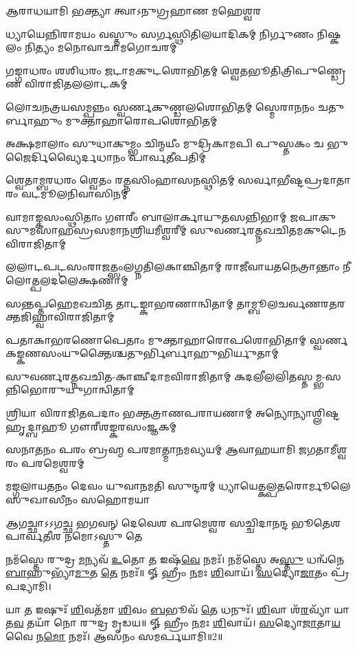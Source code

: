 
{𑌆𑌰𑌾𑌧𑌯𑌾𑌮𑌿 𑌭𑌕𑍍𑌤𑍍𑌯𑌾 𑌤𑍍𑌵𑌾𑌽𑌨𑍁𑌗𑍍𑌰𑌹𑌾𑌣 𑌮𑌹𑍇𑌶𑍍𑌵𑌰}



\twolineshloka
{𑌧𑍍𑌯𑌾𑌯𑍇𑌨𑍍𑌨𑌿𑌰𑌾𑌮𑌯𑌂 𑌵𑌸𑍍𑌤𑍁𑌂 𑌸𑌰𑍍𑌗𑌸𑍍𑌥𑌿𑌤𑌿𑌲𑌯𑌾𑌦𑌿𑌕𑌮𑍍}
{𑌨𑌿𑌰𑍍𑌗𑍁𑌣𑌂 𑌨𑌿𑌷𑍍𑌕𑌲𑌂 𑌨𑌿𑌤𑍍𑌯𑌂 𑌮𑌨𑍋𑌵𑌾𑌚𑌾𑌮𑌗𑍋𑌚𑌰𑌮𑍍}

\twolineshloka
{𑌗𑌙𑍍𑌗𑌾𑌧𑌰𑌂 𑌶𑌶𑌿𑌧𑌰𑌂 𑌜𑌟𑌾𑌮𑌕𑍁𑌟𑌶𑍋𑌭𑌿𑌤𑌮𑍍}
{𑌶𑍍𑌵𑍇𑌤𑌭𑍂𑌤𑌿𑌤𑍍𑌰𑌿𑌪𑍁𑌣𑍍𑌡𑍍𑌰𑍇𑌣 𑌵𑌿𑌰𑌾𑌜𑌿𑌤𑌲𑌲𑌾𑌟𑌕𑌮𑍍}

\twolineshloka
{𑌲𑍋𑌚𑌨𑌤𑍍𑌰𑌯𑌸𑌮𑍍𑌪𑌨𑍍𑌨𑌂 𑌸𑍍𑌵𑌰𑍍𑌣𑌕𑍁𑌣𑍍𑌡𑌲𑌶𑍋𑌭𑌿𑌤𑌮𑍍}
{𑌸𑍍𑌮𑍇𑌰𑌾𑌨𑌨𑌂 𑌚𑌤𑍁𑌰𑍍𑌬𑌾𑌹𑍁𑌂 𑌮𑍁𑌕𑍍𑌤𑌾𑌹𑌾𑌰𑍋𑌪𑌶𑍋𑌭𑌿𑌤𑌮𑍍}

\twolineshloka
{𑌅𑌕𑍍𑌷𑌮𑌾𑌲𑌾𑌂 𑌸𑍁𑌧𑌾𑌕𑍁𑌮𑍍𑌭𑌂 𑌚𑌿𑌨𑍍𑌮𑌯𑍀𑌂 𑌮𑍁𑌦𑍍𑌰𑌿𑌕𑌾𑌮𑌪𑌿}
{𑌪𑍁𑌸𑍍𑌤𑌕𑌂 𑌚 𑌭𑍁𑌜𑍈𑌰𑍍𑌦𑌿𑌵𑍍𑌯𑍈𑌰𑍍𑌦𑌧𑌾𑌨𑌂 𑌪𑌾𑌰𑍍𑌵𑌤𑍀𑌪𑌤𑌿𑌮𑍍}

\twolineshloka
{𑌶𑍍𑌵𑍇𑌤𑌾𑌮𑍍𑌬𑌰𑌧𑌰𑌂 𑌶𑍍𑌵𑍇𑌤𑌂 𑌰𑌤𑍍𑌨𑌸𑌿𑌂𑌹𑌾𑌸𑌨𑌸𑍍𑌥𑌿𑌤𑌮𑍍}
{𑌸𑌰𑍍𑌵𑌾𑌭𑍀𑌷𑍍𑌟𑌪𑍍𑌰𑌦𑌾𑌤𑌾𑌰𑌂 𑌵𑌟𑌮𑍂𑌲𑌨𑌿𑌵𑌾𑌸𑌿𑌨𑌮𑍍}

\threelineshloka
{𑌵𑌾𑌮𑌾𑌙𑍍𑌕𑌸𑌂𑌸𑍍𑌥𑌿𑌤𑌾𑌂 𑌗𑍗𑌰𑍀𑌂 𑌬𑌾𑌲𑌾𑌰𑍍𑌕𑌾𑌯𑍁𑌤𑌸𑌨𑍍𑌨𑌿𑌭𑌾𑌮𑍍}
{𑌜𑌪𑌾𑌕𑍁𑌸𑍁𑌮𑌸𑌾𑌹𑌸𑍍𑌰𑌸𑌮𑌾𑌨𑌶𑍍𑌰𑌿𑌯𑌮𑍀𑌶𑍍𑌵𑌰𑍀𑌮𑍍}
{𑌸𑍁𑌵𑌰𑍍𑌣𑌰𑌤𑍍𑌨𑌖𑌚𑌿𑌤𑌮𑌕𑍁𑌟𑍇𑌨 𑌵𑌿𑌰𑌾𑌜𑌿𑌤𑌾𑌮𑍍}

\twolineshloka
{𑌲𑌲𑌾𑌟𑌪𑌟𑍍𑌟𑌸𑌂𑌰𑌾𑌜𑌤𑍍𑌸𑌂𑌲𑌗𑍍𑌨𑌤𑌿𑌲𑌕𑌾𑌞𑍍𑌚𑌿𑌤𑌾𑌮𑍍}
{𑌰𑌾𑌜𑍀𑌵𑌾𑌯𑌤𑌨𑍇𑌤𑍍𑌰𑌾𑌨𑍍𑌤𑌾𑌂 𑌨𑍀𑌲𑍋𑌤𑍍𑌪𑌲𑌦𑌲𑍇𑌕𑍍𑌷𑌣𑌾𑌮𑍍}

\twolineshloka
{𑌸𑌨𑍍𑌤𑌪𑍍𑌤𑌹𑍇𑌮𑌖𑌚𑌿𑌤 𑌤𑌾𑌟𑌙𑍍𑌕𑌾𑌭𑌰𑌣𑌾𑌨𑍍𑌵𑌿𑌤𑌾𑌮𑍍}
{𑌤𑌾𑌮𑍍𑌬𑍂𑌲𑌚𑌰𑍍𑌵𑌣𑌰𑌤𑌰𑌕𑍍𑌤𑌜𑌿𑌹𑍍𑌵𑌾𑌵𑌿𑌰𑌾𑌜𑌿𑌤𑌾𑌮𑍍}

\twolineshloka
{𑌪𑌤𑌾𑌕𑌾𑌭𑌰𑌣𑍋𑌪𑍇𑌤𑌾𑌂 𑌮𑍁𑌕𑍍𑌤𑌾𑌹𑌾𑌰𑍋𑌪𑌶𑍋𑌭𑌿𑌤𑌾𑌮𑍍}
{𑌸𑍍𑌵𑌰𑍍𑌣𑌕𑌙𑍍𑌕𑌣𑌸𑌂𑌯𑍁𑌕𑍍𑌤𑍈𑌶𑍍𑌚𑌤𑍁𑌰𑍍𑌭𑌿𑌰𑍍𑌬𑌾𑌹𑍁𑌭𑌿𑌰𑍍𑌯𑍁𑌤𑌾𑌮𑍍}

\twolineshloka
{𑌸𑍁𑌵𑌰𑍍𑌣𑌰𑌤𑍍𑌨𑌖𑌚𑌿𑌤-𑌕𑌾𑌞𑍍𑌚𑍀𑌦𑌾𑌮𑌵𑌿𑌰𑌾𑌜𑌿𑌤𑌾𑌮𑍍}
{𑌕𑌦𑌲𑍀𑌲𑌲𑌿𑌤𑌸𑍍𑌤𑌮𑍍𑌭-𑌸𑌨𑍍𑌨𑌿𑌭𑍋𑌰𑍁𑌯𑍁𑌗𑌾𑌨𑍍𑌵𑌿𑌤𑌾𑌮𑍍}

\twolineshloka
{𑌶𑍍𑌰𑌿𑌯𑌾 𑌵𑌿𑌰𑌾𑌜𑌿𑌤𑌪𑌦𑌾𑌂 𑌭𑌕𑍍𑌤𑌤𑍍𑌰𑌾𑌣𑌪𑌰𑌾𑌯𑌣𑌾𑌮𑍍}
{𑌅𑌨𑍍𑌯𑍋𑌨𑍍𑌯𑌾𑌶𑍍𑌲𑌿𑌷𑍍𑌟𑌹𑍃𑌦𑍍𑌬𑌾𑌹𑍂 𑌗𑍗𑌰𑍀𑌶𑌙𑍍𑌕𑌰𑌸𑌂𑌜𑍍𑌞𑌕𑌮𑍍}

\twolineshloka
{𑌸𑌨𑌾𑌤𑌨𑌂 𑌪𑌰𑌂 𑌬𑍍𑌰𑌹𑍍𑌮 𑌪𑌰𑌮𑌾𑌤𑍍𑌮𑌾𑌨𑌮𑌵𑍍𑌯𑌯𑌮𑍍}
{𑌆𑌵𑌾𑌹𑌯𑌾𑌮𑌿 𑌜𑌗𑌤𑌾𑌮𑍀𑌶𑍍𑌵𑌰𑌂 𑌪𑌰𑌮𑍇𑌶𑍍𑌵𑌰𑌮𑍍}

\twolineshloka
{𑌮𑌙𑍍𑌗𑌲𑌾𑌯𑌤𑌨𑌂 𑌦𑍇𑌵𑌂 𑌯𑍁𑌵𑌾𑌨𑌮𑌤𑌿 𑌸𑍁𑌨𑍍𑌦𑌰𑌮𑍍}
{𑌧𑍍𑌯𑌾𑌯𑍇𑌤𑍍𑌕𑌲𑍍𑌪𑌤𑌰𑍋𑌰𑍍𑌮𑍂𑌲𑍇 𑌸𑍁𑌖𑌾𑌸𑍀𑌨𑌂 𑌸𑌹𑍋𑌮𑌯𑌾}

\twolineshloka
{𑌆𑌗𑌚𑍍𑌛𑌾𑌽𑌽𑌗𑌚𑍍𑌛 𑌭𑌗𑌵𑌨𑍍 𑌦𑍇𑌵𑍇𑌶 𑌪𑌰𑌮𑍇𑌶𑍍𑌵𑌰}
{𑌸𑌚𑍍𑌚𑌿𑌦𑌾𑌨𑌨𑍍𑌦 𑌭𑍂𑌤𑍇𑌶 𑌪𑌾𑌰𑍍𑌵𑌤𑍀𑌶 𑌨𑌮𑍋𑌽𑌸𑍍𑌤𑍁 𑌤𑍇}

{\small \closesection}



𑌨𑌮᳴𑌸𑍍𑌤𑍇 𑌰𑍁𑌦𑍍𑌰 \ul{𑌮}\-𑌨𑍍𑌯𑌵᳴ \ul{𑌉}\-𑌤𑍋 \ul{𑌤} 𑌇𑌷᳴\-\ul{𑌵𑍇} 𑌨𑌮𑌃᳴। 𑌨𑌮᳴𑌸𑍍𑌤𑍇 𑌅\-\ul{𑌸𑍍𑌤𑍁} 𑌧𑌨𑍍𑌵᳴𑌨𑍇 \ul{𑌬𑌾}\-𑌹𑍁𑌭𑍍𑌯𑌾᳴\-\ul{𑌮𑍁}\-𑌤 \ul{𑌤𑍇} 𑌨𑌮𑌃᳴॥ 𑍐 𑌹𑍍𑌰𑍀𑌂 \ul{𑌨}\-𑌮𑌃 \ul{𑌶𑌿}\-𑌵𑌾𑌯᳴। \ul{𑌸}\-𑌦𑍍𑌯𑍋\-\ul{𑌜𑌾}\-𑌤𑌂 𑌪𑍍𑌰᳴𑌪𑌦𑍍𑌯𑌾𑌮𑌿।

𑌯𑌾 \ul{𑌤} 𑌇𑌷𑍁𑌃᳴ \ul{𑌶𑌿}\-𑌵𑌤᳴𑌮𑌾 \ul{𑌶𑌿}\-𑌵𑌂 \ul{𑌬}\-𑌭𑍂𑌵᳴ \ul{𑌤𑍇} 𑌧𑌨𑍁𑌃᳴। \ul{𑌶𑌿}\-𑌵𑌾 𑌶᳴\-\ul{𑌰}\-𑌵𑍍𑌯𑌾᳴ 𑌯𑌾 𑌤\-\ul{𑌵} 𑌤𑌯𑌾᳴ 𑌨𑍋 𑌰𑍁𑌦𑍍𑌰 𑌮𑍃𑌡𑌯॥ 𑍐 𑌹𑍍𑌰𑍀𑌂 \ul{𑌨}\-𑌮𑌃 \ul{𑌶𑌿}\-𑌵𑌾𑌯᳴। \ul{𑌸}\-𑌦𑍍𑌯𑍋\-\ul{𑌜𑌾}\-𑌤𑌾\-\ul{𑌯} 𑌵𑍈 𑌨\-\ul{𑌮𑍋} 𑌨𑌮𑌃᳴। 𑌆𑌸𑌨𑌂 𑌸𑌮𑌰𑍍𑌪𑌯𑌾𑌮𑌿॥2॥


